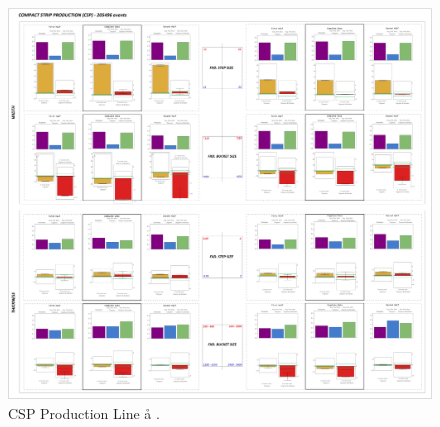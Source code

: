 \begin{landscape}
	\begin{figure}[ht]
		\centering
		\includegraphics[width=1.1\textwidth]{../images/supplements-CSP_real_life_events_analysis-results.png}
		\caption{CSP Production Line \aa{} \bb{}.}
		\label{figure-supplements-CSP}
	\end{figure}
\end{landscape}